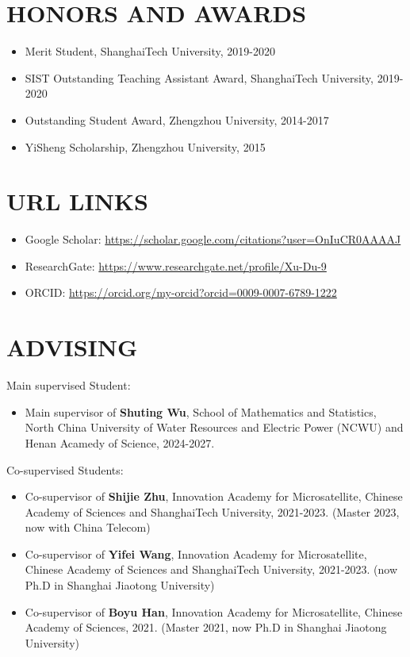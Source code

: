 \documentclass[paper=a4,fontsize=11pt]{scrartcl} %
\newcommand{\sepspace}{\vspace*{1em}}		%
\newcommand{\NewPart}[1]{\section*{\uppercase{#1}}}
\newcommand{\EducationEntry}[4]{
	\noindent \textbf{#1} \hfill      %
	\colorbox{White}{%
		\parbox{5cm}{%
			\hfill\color{Black}#2}} \par  %
	\noindent \textit{#3} \par        %
	\noindent\hangindent=2em\hangafter=0 \small #4 %
	\normalsize \par}
\begin{document}
			
			\NewPart{HONORS AND AWARDS}
			\begin{itemize}
				\item Merit Student, ShanghaiTech University, 2019-2020
				
				\item SIST Outstanding Teaching Assistant Award, ShanghaiTech University, 2019-2020
				
				
				\item Outstanding Student Award, Zhengzhou University, 2014-2017
				
				\item YiSheng Scholarship, Zhengzhou University, 2015
				
				
			\end{itemize}
			\NewPart{URL Links}
			\begin{itemize}
				\item Google Scholar: \url{https://scholar.google.com/citations?user=OnIuCR0AAAAJ}
				\item ResearchGate: \url{https://www.researchgate.net/profile/Xu-Du-9}
				\item ORCID: \url{https://orcid.org/my-orcid?orcid=0009-0007-6789-1222}
			\end{itemize}
			
			\NewPart{Advising}
			
			Main supervised Student:
			\begin{itemize}
				\item Main supervisor of \textbf{Shuting Wu}, School of Mathematics and Statistics, North China University of Water Resources and Electric Power (NCWU) and Henan Acamedy of Science, 2024-2027. 
			\end{itemize}
			
			Co-supervised Students:
			\begin{itemize}
				
				
			
				
				\item Co-supervisor of \textbf{Shijie Zhu}, Innovation Academy for Microsatellite, Chinese Academy
				of Sciences and ShanghaiTech University, 2021-2023. (Master 2023, now with China
				Telecom)
				
				
				\item Co-supervisor of \textbf{Yifei Wang}, Innovation Academy for Microsatellite, Chinese
				Academy of Sciences and ShanghaiTech University, 2021-2023. (now Ph.D in Shanghai Jiaotong University)
				
				\item Co-supervisor of \textbf{Boyu Han}, Innovation Academy for Microsatellite, Chinese Academy
				of Sciences, 2021. (Master 2021, now Ph.D in Shanghai Jiaotong University)
			\end{itemize}
			
\end{document}
